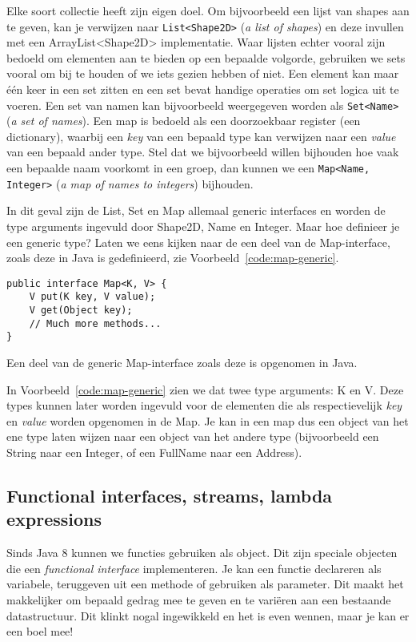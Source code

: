 Elke soort collectie heeft zijn eigen doel. 
Om bijvoorbeeld een lijst van shapes aan te geven, 
kan je verwijzen naar \texttt{List<Shape2D>} (\textit{a list of shapes})
en deze invullen met een ArrayList<Shape2D> implementatie.
Waar lijsten echter vooral zijn bedoeld om elementen aan te bieden op een bepaalde volgorde,
gebruiken we sets vooral om bij te houden of we iets gezien hebben of niet. Een element 
kan maar één keer in een set zitten en een set bevat handige operaties om set logica 
uit te voeren. Een set van namen kan bijvoorbeeld weergegeven worden als 
\texttt{Set<Name>} (\textit{a set of names}).
Een map is bedoeld als een doorzoekbaar register (een dictionary),
waarbij een \textit{key} van een bepaald type kan verwijzen naar 
een \textit{value} van een bepaald ander type. Stel dat we bijvoorbeeld
willen bijhouden hoe vaak een bepaalde naam voorkomt in een groep,
dan kunnen we een \texttt{Map<Name, Integer>} (\textit{a map of names to integers})
bijhouden.

In dit geval zijn de List, Set en Map allemaal generic interfaces en
worden de type arguments ingevuld door Shape2D, Name en Integer.
Maar hoe definieer je een generic type? Laten we eens kijken naar de 
een deel van de Map-interface, zoals deze in Java is gedefinieerd,
zie Voorbeeld~\ref{code:map-generic}.

\begin{listing}[H]
\begin{verbatim}
public interface Map<K, V> {
    V put(K key, V value);
    V get(Object key);
    // Much more methods...
}
\end{verbatim}
\caption{Een deel van de generic Map-interface zoals deze is opgenomen in Java.}
\label{code:map-generic}
\end{listing}

In Voorbeeld~\ref{code:map-generic} zien we dat twee type arguments:
K en V. Deze types kunnen later worden ingevuld voor de elementen die 
als respectievelijk \textit{key} en \textit{value} worden opgenomen in de Map.
Je kan in een map dus een object van het ene type laten wijzen naar een 
object van het andere type 
(bijvoorbeeld een String naar een Integer, of een FullName naar een Address).

\subsection{Functional interfaces, streams, lambda expressions}
Sinds Java 8 kunnen we functies gebruiken als object. Dit zijn speciale objecten 
die een \textit{functional interface} implementeren. Je kan 
een functie declareren als variabele, teruggeven uit een methode of gebruiken 
als parameter. Dit maakt het makkelijker om bepaald gedrag mee te geven en 
te variëren aan een bestaande datastructuur. Dit klinkt nogal ingewikkeld en het 
is even wennen, maar je kan er een boel mee!

